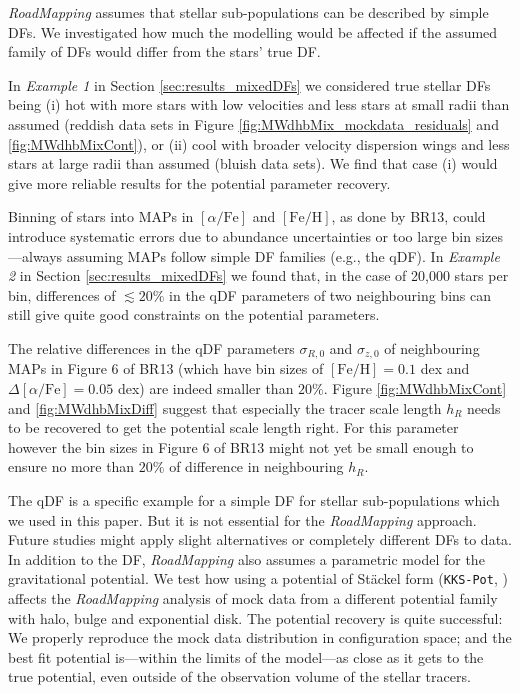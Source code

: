 \documentclass[iop,revtex4,numberedappendix,appendixfloats]{emulateapj}
\newcommand{\MAPs}{MAPs}
\newcommand{\RM}{{\sl RoadMapping}}
\begin{document}
 \RM{} assumes that stellar sub-populations can be described by simple DFs. We investigated how much the modelling would be affected if the assumed family of DFs would differ from the stars' true DF.

In \emph{Example 1} in Section \ref{sec:results_mixedDFs} we considered true stellar DFs being (i) hot with more stars with low velocities and less stars at small radii than assumed (reddish data sets in Figure \ref{fig:MWdhbMix_mockdata_residuals} and \ref{fig:MWdhbMixCont}), or (ii) cool with broader velocity dispersion wings and less stars at large radii than assumed (bluish data sets). We find that case (i) would give more reliable results for the potential parameter recovery.

Binning of stars into \MAPs{} in $[\alpha/\mathrm{Fe}]$ and $[\mathrm{Fe}/\mathrm{H}]$, as done by BR13, could introduce systematic errors due to abundance uncertainties or too large bin sizes---always assuming \MAPs{} follow simple DF families (e.g., the qDF). In \emph{Example 2} in Section \ref{sec:results_mixedDFs} we found that, in the case of 20,000 stars per bin, differences of $\lesssim 20\%$ in the qDF parameters of two neighbouring bins can still give quite good constraints on the potential parameters.

The relative differences in the qDF parameters $\sigma_{R,0}$ and $\sigma_{z,0}$ of neighbouring \MAPs{} in Figure 6 of BR13 (which have bin sizes of $[\mathrm{Fe}/\mathrm{H}] = 0.1$ dex and $\Delta [\alpha/\mathrm{Fe}] = 0.05$ dex) are indeed smaller than $20\%$. Figure \ref{fig:MWdhbMixCont} and \ref{fig:MWdhbMixDiff} suggest that especially the tracer scale length $h_R$ needs to be recovered to get the potential scale length right. For this parameter however the bin sizes in Figure 6 of BR13 might not yet be small enough to ensure no more than $20\%$ of difference in neighbouring $h_R$.

The qDF is a specific example for a simple DF for stellar sub-populations which we used in this paper. But it is not essential for the \RM{} approach. Future studies might apply slight alternatives or completely different DFs to data.\\

 In addition to the DF, \RM{} also assumes a parametric model for the gravitational potential. We test how using a potential of St\"{a}ckel form (\texttt{KKS-Pot}, \citealt{1994AA...287...43B}) affects the \RM{} analysis of mock data from a different potential family with halo, bulge and exponential disk. The potential recovery is quite successful: We properly reproduce the mock data distribution in configuration space; and the best fit potential is---within the limits of the model---as close as it gets to the true potential, even outside of the observation volume of the stellar tracers. 
\end{document}

